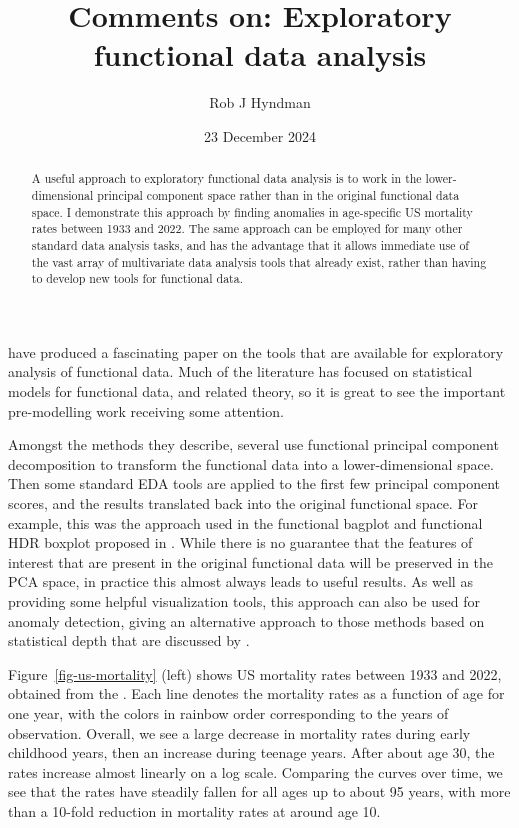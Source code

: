 \documentclass[
  11pt,
  a4paper,
]{article}
\title{Comments on: Exploratory functional data analysis}
\author{Rob J Hyndman}
\date{23 December 2024}
\let\oldmaketitle\maketitle
\def\maketitle{
\vspace*{-2cm}
\definecolor{shadecolor}{RGB}{210,210,210}
\begin{snugshade}\sffamily
\oldmaketitle
\end{snugshade}\vspace*{0.5cm}
\definecolor{shadecolor}{RGB}{248,248,248}
}
\begin{document}
\maketitle
\begin{abstract}
A useful approach to exploratory functional data analysis is to work in
the lower-dimensional principal component space rather than in the
original functional data space. I demonstrate this approach by finding
anomalies in age-specific US mortality rates between 1933 and 2022. The
same approach can be employed for many other standard data analysis
tasks, and has the advantage that it allows immediate use of the vast
array of multivariate data analysis tools that already exist, rather
than having to develop new tools for functional data.
\end{abstract}


\textcite{efda} have produced a fascinating paper on the tools that are
available for exploratory analysis of functional data. Much of the
literature has focused on statistical models for functional data, and
related theory, so it is great to see the important pre-modelling work
receiving some attention.

Amongst the methods they describe, several use functional principal
component decomposition \autocite{RD91} to transform the functional data
into a lower-dimensional space. Then some standard EDA tools are applied
to the first few principal component scores, and the results translated
back into the original functional space. For example, this was the
approach used in the functional bagplot and functional HDR boxplot
proposed in \textcite{HS10}. While there is no guarantee that the
features of interest that are present in the original functional data
will be preserved in the PCA space, in practice this almost always leads
to useful results. As well as providing some helpful visualization
tools, this approach can also be used for anomaly detection, giving an
alternative approach to those methods based on statistical depth that
are discussed by \textcite{efda}.

Figure~\ref{fig-us-mortality} (left) shows US mortality rates between
1933 and 2022, obtained from the \textcite{HMD}. Each line denotes the
mortality rates as a function of age for one year, with the colors in
rainbow order corresponding to the years of observation. Overall, we see
a large decrease in mortality rates during early childhood years, then
an increase during teenage years. After about age 30, the rates increase
almost linearly on a log scale. Comparing the curves over time, we see
that the rates have steadily fallen for all ages up to about 95 years,
with more than a 10-fold reduction in mortality rates at around age 10.
\end{document}
